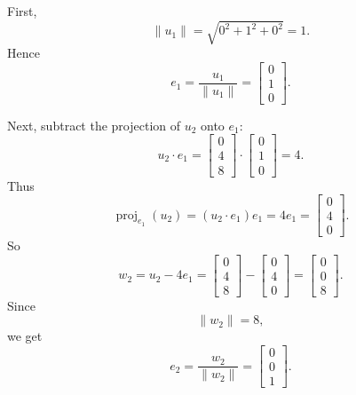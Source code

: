\documentclass[12pt]{article}
\begin{document}
First,
\[
\|u_1\|=\sqrt{0^2+1^2+0^2}=1.
\]
Hence
\[
e_1=\frac{u_1}{\|u_1\|}
=\begin{bmatrix}0\\1\\0\end{bmatrix}.
\]

Next, subtract the projection of $u_2$ onto $e_1$:
\[
u_2\cdot e_1=
\begin{bmatrix}0\\4\\8\end{bmatrix}\cdot
\begin{bmatrix}0\\1\\0\end{bmatrix}=4.
\]
Thus
\[
\operatorname{proj}_{e_1}(u_2)=(u_2\cdot e_1)e_1=4e_1
=\begin{bmatrix}0\\4\\0\end{bmatrix}.
\]
So
\[
w_2=u_2-4e_1
=\begin{bmatrix}0\\4\\8\end{bmatrix}
-\begin{bmatrix}0\\4\\0\end{bmatrix}
=\begin{bmatrix}0\\0\\8\end{bmatrix}.
\]
Since
\[
\|w_2\|=8,
\]
we get
\[
e_2=\frac{w_2}{\|w_2\|}
=\begin{bmatrix}0\\0\\1\end{bmatrix}.
\]
\end{document}
